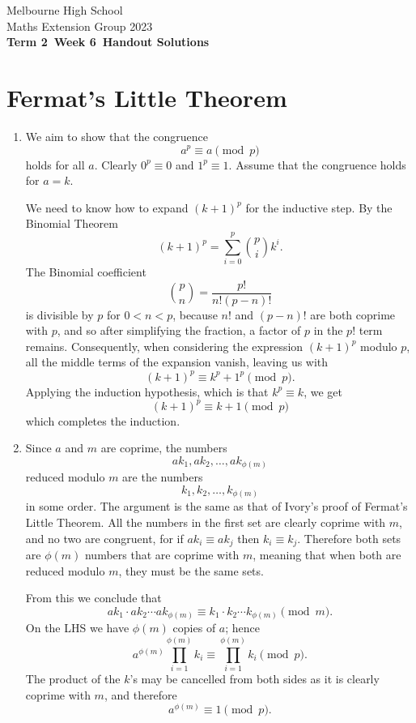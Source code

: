 \documentclass[a4paper]{article}
\title{{\thepdftitle}}
\author{Nathan Wong\and Tom Yan}
\date{2023}
\newcommand{\theterm}{2}
\newcommand{\theweek}{6}
\newcommand{\thedisplaytitle}{Term \theterm\ Week \theweek\ Handout Solutions}
\begin{document}
\noindent Melbourne High School\\
\noindent Maths Extension Group 2023\\
\noindent \textbf{\thedisplaytitle}\\
\section*{Fermat's Little Theorem}
\begin{enumerate}
\item We aim to show that the congruence \[a^p\equiv a\pmod{p}\] holds
  for all \(a\). Clearly \(0^p\equiv 0\) and \(1^p\equiv 1\). Assume
  that the congruence holds for \(a=k\).

  We need to know how to expand \((k+1)^p\) for the inductive step.
  By the Binomial Theorem \[(k+1)^p=\sum_{i=0}^{p}\binom{p}{i}k^{i}.\]
  The Binomial coefficient \[\binom{p}{n}=\frac{p!}{n!(p-n)!}\] is divisible
  by \(p\) for \(0<n<p\), because \(n!\) and \((p-n)!\) are both coprime with \(p\),
  and so after simplifying the fraction, a factor of \(p\) in the \(p!\)
  term remains. Consequently, when considering the expression \((k+1)^p\)
  modulo \(p\), all the middle terms of the expansion vanish, leaving us
  with \[(k+1)^p\equiv k^p+1^p\pmod{p}.\] Applying the induction hypothesis,
  which is that \(k^p\equiv k\), we get \[(k+1)^p\equiv k+1\pmod{p}\] which completes the induction.
\item
  Since \(a\) and \(m\) are coprime, the numbers \[ak_1,ak_2,\ldots,ak_{\phi(m)}\] reduced modulo \(m\) are the numbers \[k_1,k_2,\ldots,k_{\phi(m)}\] in some
  order. The argument is the same as that of Ivory's proof
  of Fermat's Little Theorem. All the numbers in the first set
  are clearly coprime with \(m\), and no two are congruent, for if
  \(ak_i\equiv ak_j\) then \(k_i\equiv k_j\). Therefore both sets are \(\phi(m)\) numbers that are coprime with \(m\), meaning that when both are reduced modulo \(m\), they must be the same sets.

  From this we conclude that
  \[ak_1\cdot ak_2\cdots ak_{\phi(m)}\equiv k_1\cdot k_2\cdots k_{\phi(m)}\pmod{m}.\]
  On the LHS we have \(\phi(m)\) copies of \(a\); hence
  \[a^{\phi(m)}\prod_{i=1}^{\phi(m)}k_i\equiv \prod_{i=1}^{\phi(m)}k_i\pmod{p}.\]
  The product of the \(k\)'s may be cancelled from both sides as it is
  clearly coprime with \(m\), and therefore \[a^{\phi(m)}\equiv1\pmod{p}.\]
\end{enumerate}
\end{document}
